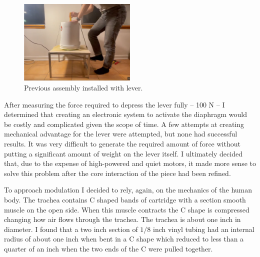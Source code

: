 \documentclass[letterpaper]{article}
\begin{document}
\begin{figure}[h]
\includegraphics[width=0.5\textwidth]{images/playablebreath1.png}
\caption{Previous assembly installed with lever.}
\end{figure}

After measuring the force required to depress the lever fully -- 100 N -- I determined that creating an electronic system to activate the diaphragm would be costly and complicated given the scope of time. A few attempts at creating mechanical advantage for the lever were attempted, but none had successful results. It was very difficult to generate the required amount of force without putting a significant amount of weight on the lever itself. I ultimately decided that, due to the expense of high-powered and quiet motors, it made more sense to solve this problem after the core interaction of the piece had been refined. 

To approach modulation I decided to rely, again, on the mechanics of the human body. The trachea contains C shaped bands of cartridge with a section smooth muscle on the open side. When this muscle contracts the C shape is compressed changing how air flows through the trachea. The trachea is about one inch in diameter.\cite{furlow} I found that a two inch section of $1/8$ inch vinyl tubing had an internal radius of about one inch when bent in a C shape which reduced to less than a quarter of an inch when the two ends of the C were pulled together.  
\end{document}
